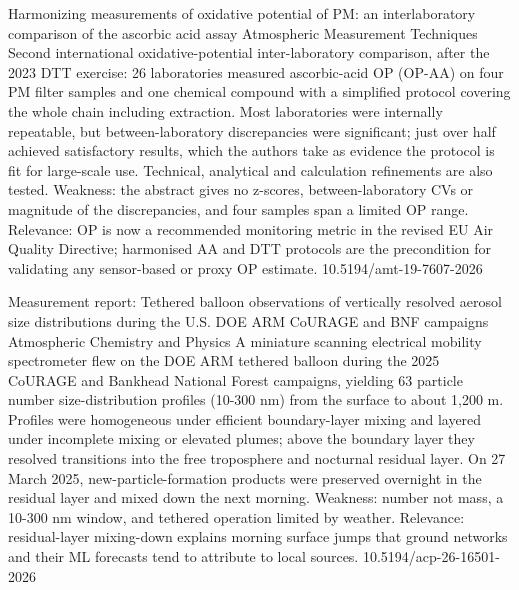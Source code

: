 \documentclass[10pt]{article}
\begin{document}
\par{}\baselineskip{}\baselineskip
{}

{Harmonizing measurements of oxidative potential of PM: an interlaboratory comparison of the ascorbic acid assay}
{Atmospheric Measurement Techniques}
{Second international oxidative-potential inter-laboratory comparison, after the 2023 DTT exercise: 26 laboratories measured ascorbic-acid OP (OP-AA) on four PM filter samples and one chemical compound with a simplified protocol covering the whole chain including extraction. Most laboratories were internally repeatable, but between-laboratory discrepancies were significant; just over half achieved satisfactory results, which the authors take as evidence the protocol is fit for large-scale use. Technical, analytical and calculation refinements are also tested. Weakness: the abstract gives no z-scores, between-laboratory CVs or magnitude of the discrepancies, and four samples span a limited OP range. Relevance: OP is now a recommended monitoring metric in the revised EU Air Quality Directive; harmonised AA and DTT protocols are the precondition for validating any sensor-based or proxy OP estimate.}
{10.5194/amt-19-7607-2026}

{Measurement report: Tethered balloon observations of vertically resolved aerosol size distributions during the U.S. DOE ARM CoURAGE and BNF campaigns}
{Atmospheric Chemistry and Physics}
{A miniature scanning electrical mobility spectrometer flew on the DOE ARM tethered balloon during the 2025 CoURAGE and Bankhead National Forest campaigns, yielding 63 particle number size-distribution profiles (10-300 nm) from the surface to about 1,200 m. Profiles were homogeneous under efficient boundary-layer mixing and layered under incomplete mixing or elevated plumes; above the boundary layer they resolved transitions into the free troposphere and nocturnal residual layer. On 27 March 2025, new-particle-formation products were preserved overnight in the residual layer and mixed down the next morning. Weakness: number not mass, a 10-300 nm window, and tethered operation limited by weather. Relevance: residual-layer mixing-down explains morning surface jumps that ground networks and their ML forecasts tend to attribute to local sources.}
{10.5194/acp-26-16501-2026}
\end{document}
